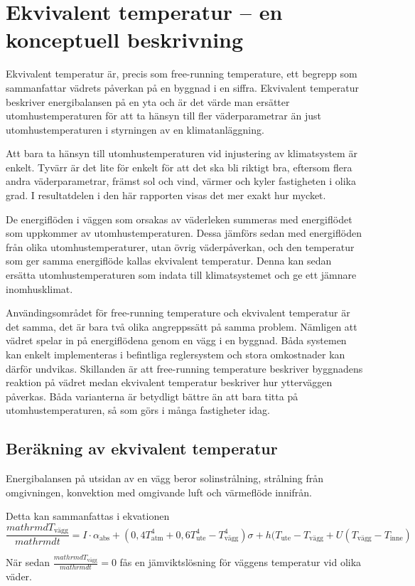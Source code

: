 \section{Ekvivalent temperatur  – en konceptuell beskrivning}
\label{sec:ekv_temp}

Ekvivalent temperatur är, precis som free-running temperature, ett begrepp som sammanfattar vädrets påverkan på en byggnad i en siffra. Ekvivalent temperatur beskriver energibalansen på en yta och är det värde man ersätter utomhustemperaturen för att ta 
hänsyn till fler väderparametrar än just utomhustemperaturen i styrningen av en 
klimatanläggning.

Att bara ta hänsyn till utomhustemperaturen vid injustering av klimatsystem är enkelt. 
Tyvärr är det lite för enkelt för att det ska bli riktigt bra, eftersom flera andra 
väderparametrar, främst sol och vind, värmer och kyler fastigheten i olika grad. I resultatdelen i den här rapporten visas det mer exakt hur mycket.

De energiflöden i väggen som orsakas av väderleken summeras med energiflödet 
som uppkommer av utomhustemperaturen. Dessa jämförs sedan med energiflöden från 
olika utomhustemperaturer, utan övrig väderpåverkan, och den temperatur som ger 
samma energiflöde kallas ekvivalent temperatur. Denna kan sedan ersätta 
utomhustemperaturen som indata till klimatsystemet och ge ett jämnare inomhusklimat. 

Användingsområdet för free-running temperature och ekvivalent temperatur är det samma, det är bara två olika angreppssätt på samma problem. Nämligen att vädret spelar in på energiflödena genom en vägg i en byggnad.  Båda systemen kan enkelt implementeras i befintliga reglersystem och stora omkostnader kan därför undvikas. Skillanden är att  free-running temperature beskriver byggnadens reaktion på vädret medan ekvivalent temperatur beskriver hur ytterväggen påverkas. Båda varianterna är betydligt bättre än att bara titta på utomhustemperaturen, så som görs i många fastigheter idag.

\subsection{Beräkning av ekvivalent temperatur}

Energibalansen på utsidan av en vägg beror solinstrålning, strålning från omgivningen, konvektion med omgivande luft och värmeflöde innifrån.

Detta kan sammanfattas i ekvationen 
\begin{equation}
\frac{mathrm{d}T_\text{vägg}}{mathrm{d}t} = 
I\cdot \alpha_\text{abs} + (0,4 T_\text{atm}^4 + 0,6 T_\text{ute}^4 - T_\text{vägg}^4 )\sigma
+ h (T_\text{ute} - T_\text{vägg} + U ( T_\text{vägg} - T_\text{inne} )
\end{equation}

När sedan $\frac{mathrm{d}T_\text{vägg}}{mathrm{d}t}=0$ fås en jämviktslösning för väggens temperatur vid olika väder.
